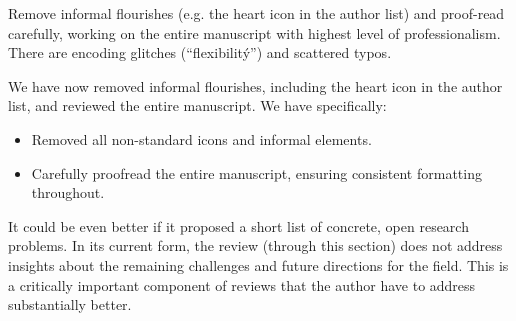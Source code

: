 \begin{point}
Remove informal flourishes (e.g. the heart icon in the author list) and proof-read carefully, working on the entire manuscript with highest level of professionalism. There are encoding glitches (``flexibilit{\'y}'') and scattered typos.
\end{point}

\begin{reply}
We have now removed informal flourishes, including the heart icon in the author list, and reviewed the entire manuscript. We have specifically:
\begin{itemize}
\item Removed all non-standard icons and informal elements.
\item Carefully proofread the entire manuscript, ensuring consistent formatting throughout.
\end{itemize}
\end{reply}

\begin{point}
It could be even better if it proposed a short list of concrete, open research problems. In its current form, the review (through this section) does not address insights about the remaining challenges and future directions for the field. This is a critically important component of reviews that the author have to address substantially better.
\end{point}

